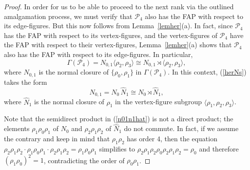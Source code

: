 \documentclass[12pt]{amsart}
\theoremstyle{definition}
\begin{document}
\begin{proof}
In order for us to be able to proceed to the next rank via the outlined amalgamation process, we must verify that $\mathcal{P}_4$ also has the FAP with respect to its edge-figures. But this now follows from Lemma~\ref{lemher}(a). In fact, since $\mathcal{P}_4$ has the FAP with respect to its vertex-figures, and the vertex-figures of $\mathcal{P}_4$ have the FAP with respect to their vertex-figures, Lemma~\ref{lemher}(a) shows that $\mathcal{P}_4$ also has the FAP with respect to its edge-figures. In particular, 
\[\Gamma({\mathcal P}_4) = N_{0,1} \langle\rho_2,\rho_3\rangle 
\cong N_{0,1}\rtimes \langle\rho_2,\rho_3\rangle,\]
where $N_{0,1}$ is the normal closure of $\{\rho_0,\rho_1\}$ in $\Gamma({\mathcal P}_4)$. In this context, (\ref{herNs}) takes the form 
\begin{equation}
\label{n01n1hat}
N_{0,1}=N_0 \,\hat{N}_{1} \cong N_0 \rtimes \hat{N}_{1},
\end{equation}
where $\hat{N}_{1}$ is the normal closure of $\rho_1$ in the vertex-figure subgroup $\langle\rho_1,\rho_2,\rho_3\rangle$.

Note that the semidirect product in (\ref{n01n1hat}) is not a direct product; the elements $\rho_{1}\rho_{0}\rho_{1}$ of $N_0$ and $\rho_{2}\rho_{1}\rho_{2}$ of $\hat{N}_{1}$ do not commute.
In fact, if we assume the contrary and keep in mind that $\rho_1\rho_2$ has order 4, then the equation
$\rho_{2}\rho_{1}\rho_{2}\cdot\rho_{1}\rho_{0}\rho_{1} \cdot\rho_{2}\rho_{1}\rho_{2}
=\rho_{1}\rho_{0}\rho_{1}$ simplifies to $\rho_{2}\rho_{1}\rho_{2}\rho_{0}\rho_{2}\rho_{1}\rho_{2}=\rho_0$ and therefore $(\rho_1\rho_0)^2=1$, contradicting the order of $\rho_0 \rho_1$. %


\end{proof}
\end{document}
